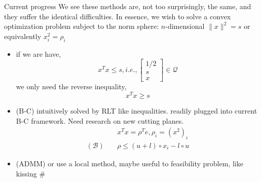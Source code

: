 \begin{frame}{Current progress}
  We see these methods are, not too surprisingly, the same, and they suffer the identical difficulties. In essence, we wish to solve a convex optimization problem subject to the norm sphere: \(n\)-dimensional \(\|x\|^2 = s\) or equivalently \(x_i^2 = \rho_i\)
  \begin{itemize}
    \item if we are have,
          \begin{equation*}
            x^Tx \le s, i.e., \begin{bmatrix}
              1/2 \\ s\\ x
            \end{bmatrix} \in \mathscr{Q}
          \end{equation*}
          we only need the reverse inequality,
          \begin{equation*}
            x^Tx \ge s
          \end{equation*}
    \item (B-C) intuitively solved by RLT like inequalities. readily plugged into current B-C framework. Need research on new cutting planes.
          \begin{align}
                               & x^Tx = \rho^Te, \rho_i = (x^2)_i     \\
            (\mathcal B) \quad & \rho \leq (u+l)\circ x_i - l \circ u
          \end{align}
    \item (ADMM) or use a local method, maybe useful to feasibility problem, like kissing \#
  \end{itemize}
\end{frame}
